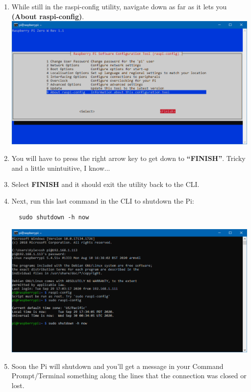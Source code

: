 \documentclass{article}
\begin{document}
\begin{enumerate}
  \item While still in the raspi-config utility, navigate down as far as it lets you \textbf{(About raspi-config)}.
  \newline
  \newline
  \includegraphics[width=1.00\textwidth]{rcfinish}
  \item You will have to press the right arrow key to get down to \textbf{``FINISH''}. Tricky and a little unintuitive, I know...
  \item Select \textbf{FINISH} and it should exit the utility back to the CLI.
  \item Next, run this last command in the CLI to shutdown the Pi:
  \begin{lstlisting}
  sudo shutdown -h now
  \end{lstlisting}
  \includegraphics[width=1.00\textwidth]{sudoshutdown}
  \item Soon the Pi will shutdown and you'll get a message in your Command Prompt/Terminal something along the lines that the connection was closed or lost. 
  \newline
  \newline

\end{enumerate}
\end{document}
